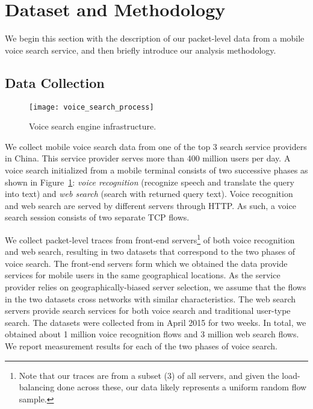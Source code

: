 
\section{Dataset and Methodology}
\label{sec:dataset}

We begin this section with the description of our packet-level data from a mobile voice search service, and then briefly introduce our analysis methodology.

\subsection{Data Collection}

\begin{figure}[th]
	\centering
	\texttt{[image: voice\_search\_process]}
	\caption{Voice search engine infrastructure.}
	\label{fig:voice_search}
\end{figure}

We collect mobile voice search data from one of the top 3 search service providers in China. This service provider serves more than 400 million users per day. A voice search initialized from a mobile terminal consists of two successive phases as shown in Figure~\ref{fig:voice_search}: \emph{voice recognition} (\ie recognize speech and translate the query into text) and \emph{web search} (\ie search with returned query text). Voice recognition and web search are served by different servers through HTTP. As such, a voice search session consists of two separate TCP flows.

We collect packet-level traces from front-end servers\footnote{Note that our traces are from a subset (3) of all servers, and given the load-balancing done across these, our data likely represents a uniform random flow sample.} of both voice recognition and web search, resulting in two datasets that correspond to the two phases of voice search. The front-end servers form which we obtained the data provide services for mobile users in the same geographical locations. As the service provider relies on geographically-biased server selection, we assume that the flows in the two datasets cross networks with similar characteristics. The web search servers provide search services for both voice search and traditional user-type search. The datasets were collected from in April 2015 for two weeks. In total, we obtained about 1 million voice recognition flows and 3 million web search flows. We report measurement results for each of the two phases of voice search.

